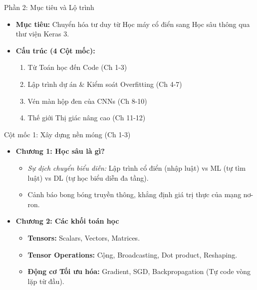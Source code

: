 \documentclass[aspectratio=169]{beamer}
\begin{document}
\begin{frame}{Phần 2: Mục tiêu và Lộ trình}
    \begin{itemize}
        \item \textbf{Mục tiêu:} Chuyển hóa tư duy từ Học máy cổ điển sang Học sâu thông qua thư viện Keras 3.
        \item \textbf{Cấu trúc (4 Cột mốc):}
        \begin{enumerate}
            \item Từ Toán học đến Code (Ch 1-3)
            \item Lập trình dự án \& Kiểm soát Overfitting (Ch 4-7)
            \item Vén màn hộp đen của CNNs (Ch 8-10)
            \item Thế giới Thị giác nâng cao (Ch 11-12)
        \end{enumerate}
    \end{itemize}
\end{frame}

\begin{frame}{Cột mốc 1: Xây dựng nền móng (Ch 1-3)}
    \begin{itemize}
        \item \textbf{Chương 1: Học sâu là gì?}
        \begin{itemize}
            \item \textit{Sự dịch chuyển biểu diễn:} Lập trình cổ điển (nhập luật) vs ML (tự tìm luật) vs DL (tự học biểu diễn đa tầng).
            \item Cảnh báo bong bóng truyền thông, khẳng định giá trị thực của mạng nơ-ron.
        \end{itemize}
        \item \textbf{Chương 2: Các khối toán học}
        \begin{itemize}
            \item \textbf{Tensors:} Scalars, Vectors, Matrices.
            \item \textbf{Tensor Operations:} Cộng, Broadcasting, Dot product, Reshaping.
            \item \textbf{Động cơ Tối ưu hóa:} Gradient, SGD, Backpropagation (Tự code vòng lặp từ đầu).
        \end{itemize}
    \end{itemize}
\end{frame}
\end{document}
